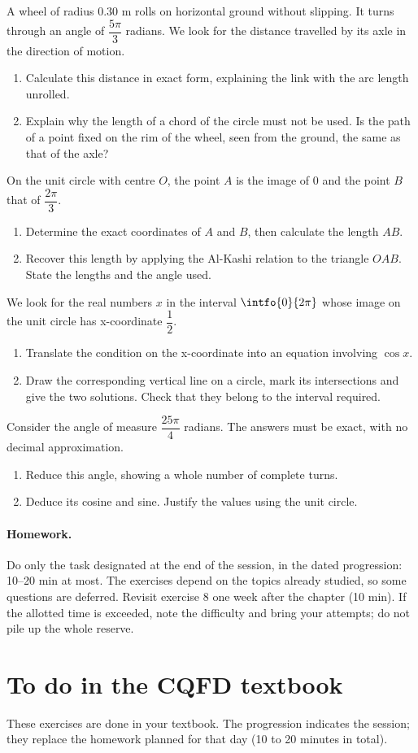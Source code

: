 A wheel of radius $\num{0,30}$ m rolls on horizontal ground without slipping. It turns through an angle of $\dfrac{5\pi}{3}$ radians. We look for the distance travelled by its axle in the direction of motion.
\begin{enumerate}[label=\arabic*.]
\item Calculate this distance in exact form, explaining the link with the arc length unrolled.
\item Explain why the length of a chord of the circle must not be used. Is the path of a point fixed on the rim of the wheel, seen from the ground, the same as that of the axle?
\end{enumerate}
On the unit circle with centre $O$, the point $A$ is the image of 0 and the point $B$ that of $\dfrac{2\pi}{3}$.
\begin{enumerate}[label=\arabic*.]
\item Determine the exact coordinates of $A$ and $B$, then calculate the length $AB$.
\item Recover this length by applying the Al-Kashi relation to the triangle $OAB$. State the lengths and the angle used.
\end{enumerate}
We look for the real numbers $x$ in the interval $\intfo{0}{2\pi}$ whose image on the unit circle has x-coordinate $\dfrac12$.
\begin{enumerate}[label=\arabic*.]
\item Translate the condition on the x-coordinate into an equation involving $\cos x$.
\item Draw the corresponding vertical line on a circle, mark its intersections and give the two solutions. Check that they belong to the interval required.
\end{enumerate}
Consider the angle of measure $\dfrac{25\pi}{4}$ radians. The answers must be exact, with no decimal approximation.
\begin{enumerate}[label=\arabic*.]
\item Reduce this angle, showing a whole number of complete turns.
\item Deduce its cosine and sine. Justify the values using the unit circle.
\end{enumerate}
\paragraph{Homework.} Do only the task designated at the end of the session, in the dated progression: 10--20 min at most. The exercises depend on the topics already studied, so some questions are deferred. Revisit exercise 8 one week after the chapter (10 min). If the allotted time is exceeded, note the difficulty and bring your attempts; do not pile up the whole reserve.
\endgroup
{}\section*{To do in the CQFD textbook}
These exercises are done in your textbook. The progression indicates the session; they replace the homework planned for that day (10 to 20 minutes in total).
